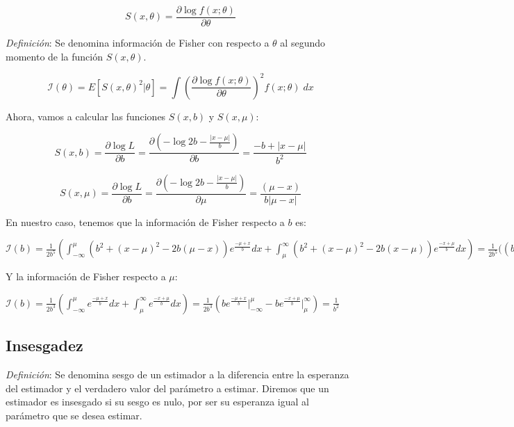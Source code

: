 \documentclass[a4paper, 10pt]{article} %
\begin{document}
$$S(x,\theta) = \frac{\partial \log f(x;\theta)}{\partial \theta}$$

\emph{Definición}: Se denomina información de Fisher con respecto a $\theta$ al segundo momento de la
función $S(x,\theta)$.

$$\mathcal{I}(\theta)=E\left[ S(x,\theta)^2 | \theta \right] = \int \left( \frac{\partial \log f(x;\theta)}
{\partial \theta} \right) ^ 2 f(x;\theta) \; dx $$

Ahora, vamos a calcular las funciones $S(x, b)$ y $S(x, \mu)$:

$$ S(x, b) = \frac{\partial \log L}{\partial b} = \frac{\partial (-\log 2b -\frac{|x-\mu|}{b})}
{\partial b} = \frac{-b+|x-\mu|}{b^2} $$

$$ S(x, \mu) = \frac{\partial \log L}{\partial b} = \frac{\partial (-\log 2b -\frac{|x-\mu|}{b})}
{\partial \mu} = \frac{(\mu-x)}{b|\mu-x|} $$

En nuestro caso, tenemos que la información de Fisher respecto a $b$ es:

$ \displaystyle \mathcal{I}(b) = \frac{1}{2b^5} \left(\int^\mu_{-\infty} \left( b^2+(x-\mu)^2-2b(\mu-x) \right) e^{\frac{-\mu+x}{b}} dx +
\int^\infty_{\mu} \left( b^2+(x-\mu)^2-2b(x-\mu) \right) e^{\frac{-x+\mu}{b}} dx \right) =
\frac{1}{2b^5} \bigg( (b^2+\mu^2-2b\mu) e^{\frac{-\mu+x}{b}} \Big|^\mu_{-\infty} +
(-2b-2\mu) b (x-b) e^{\frac{-\mu+x}{b}} \Big|^\mu_{-\infty} + (b^2+x^2-2bx) e^{\frac{-\mu+x}{b}} \Big|^\mu_{-\infty} -
(b^2+\mu^2+2b\mu) b e^{\frac{-x+\mu}{b}} \Big|^\infty_{\mu} - (-2b-2\mu) b (b+x) e^{\frac{-x+\mu}{b}} \Big|^\infty_{\mu} -
( 2b^2+x^2-2bx\mu ) b \frac{-\mu+x}{b} \Big|^\infty_{\mu} = 0
$

Y la información de Fisher respecto a $\mu$:

$ \displaystyle \mathcal{I}(b) = \frac{1}{2b^3} \left(\int^\mu_{-\infty} e^{\frac{-\mu+x}{b}} dx +
\int^\infty_{\mu} e^{\frac{-x+\mu}{b}} dx \right) =  \frac{1}{2b^3} \left( b e^{\frac{-\mu+x}{b}} \Big|^\mu_{-\infty} -
b e^{\frac{-x+\mu}{b}} \Big|^\infty_{\mu}\right) = \frac{1}{b^2}$

\subsection{Insesgadez}
\emph{Definición}: Se denomina sesgo de un estimador a la diferencia entre la esperanza del estimador
y el verdadero valor del parámetro a estimar. Diremos que un estimador es insesgado si su sesgo es nulo, por ser
su esperanza igual al parámetro que se desea estimar.
\end{document}
